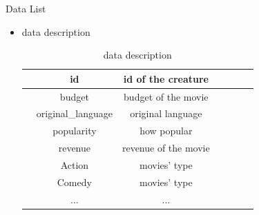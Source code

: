 \documentclass[
 size=12pt,
 paper=smartboard, %
 mode=present, %
 display=slides, %
style=tuliplab,
pauseslide,
fleqn,leqno]{powerdot}
\begin{document}
  \begin{slide}{Data List}
  \begin{itemize}
    \item data description
    \begin{table}[htbp]  \centering
      \caption{data description}
      \label{tbl:data information}
      \begin{tabular}{ccccccc}
        \hline
         & id                 & id of the creature \\
        \hline
         & budget             & budget of the movie \\
         & original_language  & original language   \\
         & popularity         & how popular         \\
         & revenue            & revenue of the movie\\
         & Action             & movies' type        \\
         & Comedy             & movies' type        \\
         & ...                & ...                 \\
        \hline 
        
      \end{tabular}
    \end{table}
    \

  \end{itemize}
\end{slide}
\end{document}

